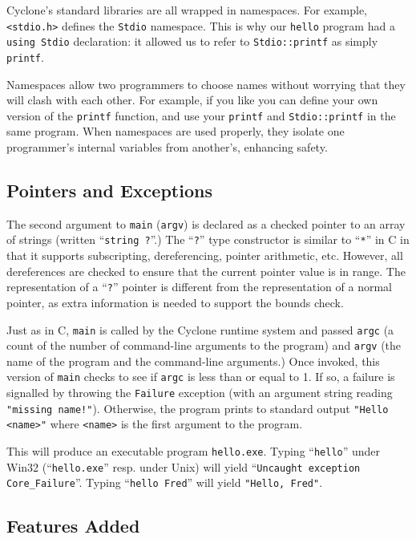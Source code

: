 Cyclone's standard libraries are all wrapped in namespaces.  For
example, \texttt{<stdio.h>} defines the \texttt{Stdio} namespace.
This is why our \texttt{hello} program had a \texttt{using Stdio}
declaration: it allowed us to refer to \texttt{Stdio::printf} as
simply \texttt{printf}.

Namespaces allow two programmers to choose names without worrying that
they will clash with each other.  For example, if you like you can
define your own version of the \texttt{printf} function, and use your
\texttt{printf} and \texttt{Stdio::printf} in the same program.  When
namespaces are used properly, they isolate one programmer's internal
variables from another's, enhancing safety.

\subsection{Pointers and Exceptions}

The second argument to \texttt{main} (\texttt{argv}) is declared as a
checked pointer to an array of strings (written ``\texttt{string ?}''.)
The ``\texttt{?}'' type constructor is similar to ``\texttt{*}'' in C in
that it supports subscripting, dereferencing, pointer arithmetic, etc.
However, all dereferences are checked to ensure that the current
pointer value is in range. The representation of a ``\texttt{?}''
pointer is different from the representation of a normal pointer, as
extra information is needed to support the bounds check.

Just as in C, \texttt{main} is called by the Cyclone runtime system and
passed \texttt{argc} (a count of the number of command-line arguments to
the program) and \texttt{argv} (the name of the program and the
command-line arguments.)  Once invoked, this version of \texttt{main}
checks to see if \texttt{argc} is less than or equal to 1.  If so, a
failure is signalled by throwing the \texttt{Failure} exception (with an
argument string reading \texttt{"missing name!"}).  Otherwise, the
program prints to standard output \texttt{"Hello <name>"} where
\texttt{<name>} is the first argument to the program.

This will produce an executable program \texttt{hello.exe}.  Typing
``\texttt{hello}'' under Win32 (``\texttt{hello.exe}'' resp. under Unix)
will yield ``\texttt{Uncaught exception Core_Failure}''.  Typing
``\texttt{hello Fred}'' will yield \texttt{"Hello, Fred"}.

\subsection{Features Added}

